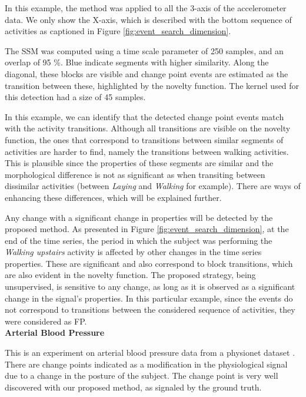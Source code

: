 In this example, the method was applied to all the 3-axis of the accelerometer data. We only show the X-axis, which is described with the bottom sequence of activities as captioned in Figure \ref{fig:event_search_dimension}.
\par
The \gls{SSM} was computed using a time scale parameter of 250 samples, and an overlap of 95 \%. Blue indicate segments with higher similarity. Along the diagonal, these blocks are visible and change point events are estimated as the transition between these, highlighted by the novelty function. The kernel used for this detection had a size of 45 samples.
\par
In this example, we can identify that the detected change point events match with the activity transitions. Although all transitions are visible on the novelty function, the ones that correspond to transitions between similar segments of activities are harder to find, namely the transitions between walking activities. This is plausible since the properties of these segments are similar and the morphological difference is not as significant as when transiting between dissimilar activities (between \textit{Laying} and \textit{Walking} for example). There are ways of enhancing these differences, which will be explained further.
\par
Any change with a significant change in properties will be detected by the proposed method. As presented in Figure \ref{fig:event_search_dimension}, at the end of the time series, the period in which the subject was performing the \textit{Walking upstairs} activity is affected by other changes in the time series properties. These are significant and also correspond to block transitions, which are also evident in the novelty function. The proposed strategy, being unsupervised, is sensitive to any change, as long as it is observed as a significant change in the signal's properties. In this particular example, since the events do not correspond to transitions between the considered sequence of activities, they were considered as FP.\\

{\normalsize \textbf{Arterial Blood Pressure}}\\
\par

This is an experiment on arterial blood pressure data from a physionet dataset \cite{tilt, PhysioNet}. There are change points indicated as a modification in the physiological signal due to a change in the posture of the subject. The change point is very well discovered with our proposed method, as signaled by the ground truth.

